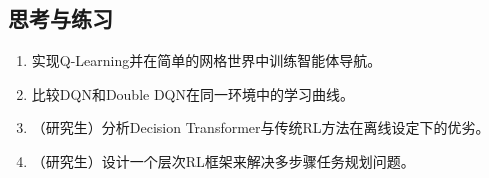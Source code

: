 \subsection*{思考与练习}
\begin{enumerate}
  \item 实现Q-Learning并在简单的网格世界中训练智能体导航。
  \item 比较DQN和Double DQN在同一环境中的学习曲线。
  \item （研究生）分析Decision Transformer与传统RL方法在离线设定下的优劣。
  \item （研究生）设计一个层次RL框架来解决多步骤任务规划问题。
\end{enumerate}

